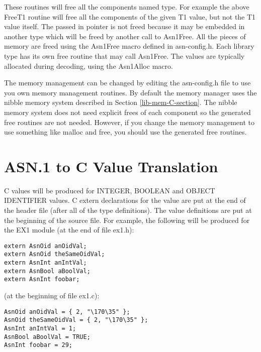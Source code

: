 These routines will free all the components named type.
For example the above {\C FreeT1} routine will free all the
components of the given {\C T1} value, but not the {\C T1} value itself.  The
passed in pointer is not freed because it may be embedded in another
type which will be freed by another call to {\C Asn1Free}.  All the pieces
of memory are freed using the {\C Asn1Free} macro defined in
{\ufn asn-config.h}.  Each library type has its own free routine that
may call {\C Asn1Free}. The values are typically allocated during
decoding, using the {\C Asn1Alloc} macro.

The memory management can be changed by editing the {\ufn asn-config.h}
file to use you own memory management routines.  By default the memory
manager uses the nibble memory system described in Section
\ref{lib-mem-C-section}.  The nibble memory system does not need explicit
frees of each component so the generated free routines are not needed.
However, if you change the memory management to use something like
{\C malloc} and {\C free}, you should use the generated free routines.


\section{\label{val-gen-C-section}ASN.1 to C Value Translation}

C values will be produced for INTEGER, BOOLEAN and OBJECT IDENTIFIER
values.  C {\C extern} declarations for the value are put at the end
of the header file (after all of the type definitions).  The value
definitions are put at the beginning of the source file. For example,
the following will be produced for the EX1 module (at the end of
file ex1.h):

\begin{small}
\begin{verbatim}
extern AsnOid anOidVal;
extern AsnOid theSameOidVal;
extern AsnInt anIntVal;
extern AsnBool aBoolVal;
extern AsnInt foobar;
\end{verbatim}
\end{small}

(at the beginning of file ex1.c):

\begin{small}
\begin{verbatim}
AsnOid anOidVal = { 2, "\170\35" };
AsnOid theSameOidVal = { 2, "\170\35" };
AsnInt anIntVal = 1;
AsnBool aBoolVal = TRUE;
AsnInt foobar = 29;
\end{verbatim}
\end{small}

